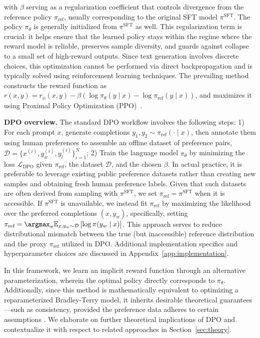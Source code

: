 with $\beta$ serving as a regularization coefficient that controls divergence from the reference policy $\pi_\text{ref}$, usually corresponding to the original SFT model $\pi^\text{SFT}$. The policy $\pi_\theta$ is generally initialized from $\pi^\text{SFT}$ as well. This regularization term is crucial: it helps ensure that the learned policy stays within the regime where the reward model is reliable, preserves sample diversity, and guards against collapse to a small set of high-reward outputs. Since text generation involves discrete choices, this optimization cannot be performed via direct backpropagation and is typically solved using reinforcement learning techniques. The prevailing method~\citep{ziegler2020finetuning, stiennon2022learning, bai2022training, ouyang2022training} constructs the reward function as ${r(x, y) = r_{\phi}(x, y) -\beta (\log \pi_{\theta}(y\mid x) - \log \pi_\text{ref}(y\mid x))}$, and maximizes it using Proximal Policy Optimization (PPO)~\cite{schulman2017proximal}.

\textbf{DPO overview.} The standard DPO workflow involves the following steps: 1) For each prompt $x$, generate completions $y_1, y_2 \sim \pi_\text{ref}(\cdot \mid x)$, then annotate them using human preferences to assemble an offline dataset of preference pairs, $\mathcal{D} = \{x^{(i)}, y_w^{(i)}, y_l^{(i)}\}_{i=1}^N$; 2) Train the language model $\pi_\theta$ by minimizing the loss $\mathcal{L}_\text{DPO}$ given $\pi_\text{ref}$, the dataset $\mathcal{D}$, and the chosen $\beta$. In actual practice, it is preferable to leverage existing public preference datasets rather than creating new samples and obtaining fresh human preference labels. Given that such datasets are often derived from sampling with $\pi^\text{SFT}$, we set $\pi_\text{ref} = \pi^\text{SFT}$ when it is accessible. If $\pi^\text{SFT}$ is unavailable, we instead fit $\pi_\text{ref}$ by maximizing the likelihood over the preferred completions ${(x, y_w)}$, specifically, setting ${\pi_\text{ref} = \argmax_{\pi}\mathbb{E}_{x, y_w \sim \mathcal{D}}\left[\log \pi(y_w \mid x)\right]}$. This approach serves to reduce distributional mismatch between the true (but inaccessible) reference distribution and the proxy $\pi_\text{ref}$ utilized in DPO. Additional implementation specifics and hyperparameter choices are discussed in Appendix~\ref{app:implementation}.

In this framework, we learn an implicit reward function through an alternative parameterization, wherein the optimal policy directly corresponds to $\pi_\theta$. Additionally, since this method is mathematically equivalent to optimizing a reparameterized Bradley-Terry model, it inherits desirable theoretical guarantees—such as consistency, provided the preference data adheres to certain assumptions \cite{bong2022generalized}. We elaborate on further theoretical implications of DPO and contextualize it with respect to related approaches in Section~\ref{sec:theory}.

